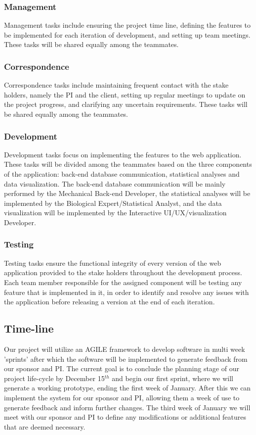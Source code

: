 \documentclass[10pt,twocolumn,letterpaper]{article}
\begin{document}
                \subsubsection{Management}
                Management tasks include ensuring the project time line, defining the features to be implemented for each iteration of development, and setting up team meetings. 
                These tasks will be shared equally among the teammates.
                \subsubsection{Correspondence}
                Correspondence tasks include maintaining frequent contact with the stake holders, namely the PI and the client, setting up regular meetings to update on the project progress, and clarifying any uncertain requirements. 
                These tasks will be shared equally among the teammates.
                \subsubsection{Development}
                Development tasks focus on implementing the features to the web application. These tasks will be divided among the teammates based on the three components of the application: back-end database communication, statistical analyses and data visualization. 
                The back-end database communication will be mainly performed by the Mechanical Back-end Developer, the statistical analyses will be implemented by the Biological Expert/Statistical Analyst, and the data visualization will be implemented by the Interactive UI/UX/visualization Developer.
                \subsubsection{Testing}
                Testing tasks ensure the functional integrity of every version of the web application provided to the stake holders throughout the development process. Each team member responsible for the assigned component will be testing any feature that is implemented in it, in order to identify and resolve any issues with the application before releasing a version at the end of each iteration.
            \subsection{Time-line}

            Our project will utilize an AGILE framework to develop software in multi week 'sprints' after which the software will be implemented to generate feedback from our sponsor and
	    PI. The current goal is to conclude the planning stage of our project life-cycle by December 15$^{th}$ and begin our first sprint, where we will generate a working prototype, ending the first week of January. After this we can implement the system for our sponsor and PI, allowing them a week of use to generate feedback and inform further changes. The third week of January we will meet with our sponsor and PI to define any modifications or additional features that are deemed necessary.
\end{document}
